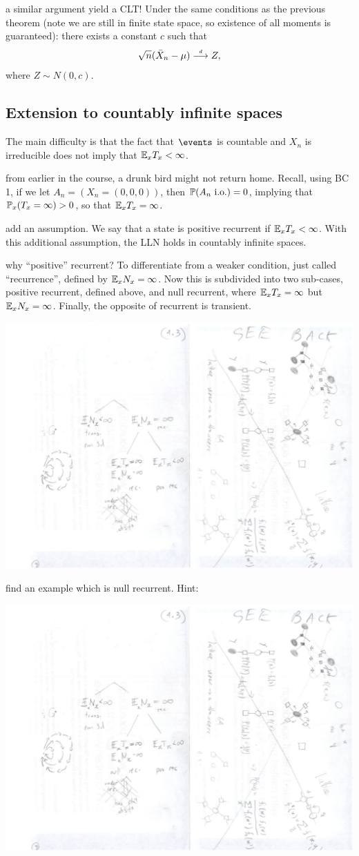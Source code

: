 \documentclass{article}
\begin{document}
 a similar argument yield a CLT! Under the same conditions as the previous theorem (note we are still in finite state space, so existence of all moments is guaranteed): there exists a constant $c$ such that
\[ \sqrt{n}(\bar X_n - \mu) \dcv Z, \]
where $Z \sim N(0, c)$.


\subsection{Extension to countably infinite spaces}

The main difficulty is that the fact that $\events$ is countable and $X_n$ is irreducible does not imply that $\E_x T_x < \infty$.

 from earlier in the course, a drunk bird might not return home. Recall, using BC 1, if we let $A_n = (X_n = (0,0,0))$, then $\P(A_n \io) = 0$, implying that $\P_x(T_x = \infty) > 0$, so that $\E_x T_x = \infty$. 

 add an assumption. We say that a state is positive recurrent if $\E_x T_x < \infty$. With this additional assumption, the LLN holds in countably infinite spaces.

 why ``positive'' recurrent? To differentiate from a weaker condition, just called ``recurrence'', defined by $\E_x N_x = \infty$. Now this is subdivided into two sub-cases, positive recurrent, defined above, and null recurrent, where $\E_x T_x = \infty$ but $\E_x N_x = \infty$. Finally, the opposite of recurrent is transient.
\begin{center}
	\includegraphics[width=0.5\linewidth]{figures/rec-hierarchy} 
\end{center}

 find an example which is null recurrent. Hint:
\begin{center}
	\includegraphics[width=0.2\linewidth]{figures/null-rec} 
\end{center}
\end{document}

